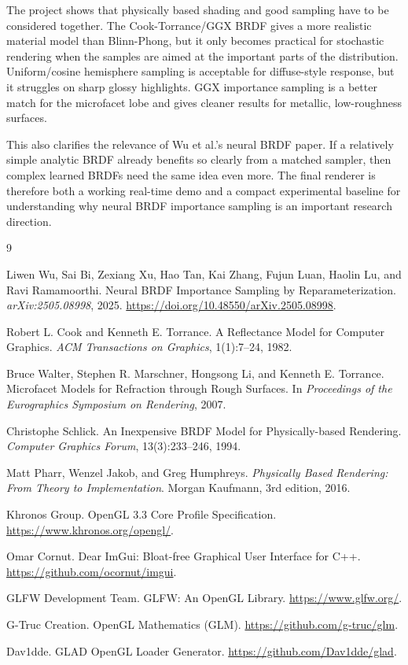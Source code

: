 \documentclass[12pt]{article}
\begin{document}
The project shows that physically based shading and good sampling have to be considered together. The Cook-Torrance/GGX BRDF gives a more realistic material model than Blinn-Phong, but it only becomes practical for stochastic rendering when the samples are aimed at the important parts of the distribution. Uniform/cosine hemisphere sampling is acceptable for diffuse-style response, but it struggles on sharp glossy highlights. GGX importance sampling is a better match for the microfacet lobe and gives cleaner results for metallic, low-roughness surfaces.

This also clarifies the relevance of Wu et al.'s neural BRDF paper. If a relatively simple analytic BRDF already benefits so clearly from a matched sampler, then complex learned BRDFs need the same idea even more. The final renderer is therefore both a working real-time demo and a compact experimental baseline for understanding why neural BRDF importance sampling is an important research direction.
\begin{thebibliography}{9}

Liwen Wu, Sai Bi, Zexiang Xu, Hao Tan, Kai Zhang, Fujun Luan, Haolin Lu, and Ravi Ramamoorthi.
\newblock Neural BRDF Importance Sampling by Reparameterization.
\newblock \emph{arXiv:2505.08998}, 2025.
\newblock \url{https://doi.org/10.48550/arXiv.2505.08998}.

Robert L. Cook and Kenneth E. Torrance.
\newblock A Reflectance Model for Computer Graphics.
\newblock \emph{ACM Transactions on Graphics}, 1(1):7--24, 1982.

Bruce Walter, Stephen R. Marschner, Hongsong Li, and Kenneth E. Torrance.
\newblock Microfacet Models for Refraction through Rough Surfaces.
\newblock In \emph{Proceedings of the Eurographics Symposium on Rendering}, 2007.

Christophe Schlick.
\newblock An Inexpensive BRDF Model for Physically-based Rendering.
\newblock \emph{Computer Graphics Forum}, 13(3):233--246, 1994.

Matt Pharr, Wenzel Jakob, and Greg Humphreys.
\newblock \emph{Physically Based Rendering: From Theory to Implementation}.
\newblock Morgan Kaufmann, 3rd edition, 2016.

Khronos Group.
\newblock OpenGL 3.3 Core Profile Specification.
\newblock \url{https://www.khronos.org/opengl/}.

Omar Cornut.
\newblock Dear ImGui: Bloat-free Graphical User Interface for C++.
\newblock \url{https://github.com/ocornut/imgui}.

GLFW Development Team.
\newblock GLFW: An OpenGL Library.
\newblock \url{https://www.glfw.org/}.

G-Truc Creation.
\newblock OpenGL Mathematics (GLM).
\newblock \url{https://github.com/g-truc/glm}.

Dav1dde.
\newblock GLAD OpenGL Loader Generator.
\newblock \url{https://github.com/Dav1dde/glad}.

\end{thebibliography}
\end{document}
